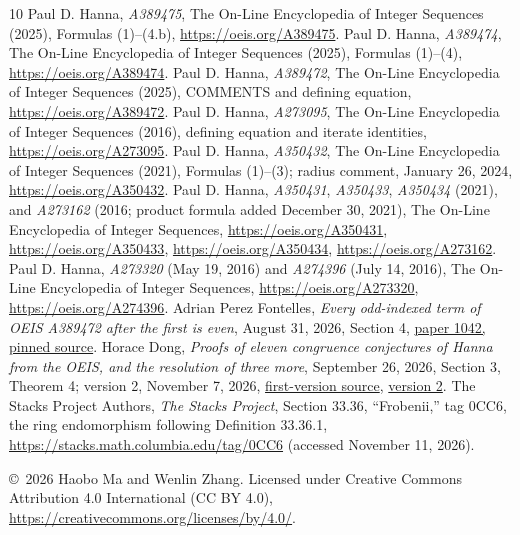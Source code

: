 \documentclass[11pt]{article}
\begin{document}
\begin{thebibliography}{10}
Paul D. Hanna, \emph{A389475}, The On-Line Encyclopedia of Integer
Sequences (2025), Formulas (1)--(4.b),
\url{https://oeis.org/A389475}.
Paul D. Hanna, \emph{A389474}, The On-Line Encyclopedia of Integer
Sequences (2025), Formulas (1)--(4),
\url{https://oeis.org/A389474}.
Paul D. Hanna, \emph{A389472}, The On-Line Encyclopedia of Integer
Sequences (2025), COMMENTS and defining equation,
\url{https://oeis.org/A389472}.
Paul D. Hanna, \emph{A273095}, The On-Line Encyclopedia of Integer
Sequences (2016), defining equation and iterate identities,
\url{https://oeis.org/A273095}.
Paul D. Hanna, \emph{A350432}, The On-Line Encyclopedia of Integer
Sequences (2021), Formulas (1)--(3); radius comment, January 26, 2024,
\url{https://oeis.org/A350432}.
Paul D. Hanna, \emph{A350431}, \emph{A350433}, \emph{A350434} (2021),
and \emph{A273162} (2016; product formula added December 30, 2021),
The On-Line Encyclopedia of Integer Sequences,
\url{https://oeis.org/A350431}, \url{https://oeis.org/A350433},
\url{https://oeis.org/A350434}, \url{https://oeis.org/A273162}.
Paul D. Hanna, \emph{A273320} (May 19, 2016) and \emph{A274396}
(July 14, 2016), The On-Line Encyclopedia of Integer Sequences,
\url{https://oeis.org/A273320}, \url{https://oeis.org/A274396}.
Adrian Perez Fontelles, \emph{Every odd-indexed term of OEIS A389472
after the first is even}, August 31, 2026, Section 4,
\href{https://github.com/astrafala/Conjectures/blob/58cf4596af4541652fb191e177ef9b7771388d53/paper-sources/01001-01500/01042-PROOF.tex}{paper 1042, pinned source}.
Horace Dong, \emph{Proofs of eleven congruence conjectures of Hanna
from the OEIS, and the resolution of three more}, September 26, 2026,
Section 3, Theorem 4; version 2, November 7, 2026,
\href{https://github.com/Horace-Maxwell/ai4math-results/blob/537ae6c44a450566edd06fda208de775ec7d7c9c/papers/oeis-hanna/note.tex}{first-version source},
\href{https://github.com/Horace-Maxwell/ai4math-results/blob/a104be9c0d4aaeeea65f6f62fed064525180a939/papers/oeis-hanna/note.pdf}{version 2}.
The Stacks Project Authors, \emph{The Stacks Project}, Section 33.36,
``Frobenii,'' tag 0CC6, the ring endomorphism following Definition 33.36.1,
\url{https://stacks.math.columbia.edu/tag/0CC6} (accessed November 11, 2026).
\end{thebibliography}

\noindent\small
\copyright\ 2026 Haobo Ma and Wenlin Zhang.
Licensed under Creative Commons Attribution 4.0 International (CC BY 4.0),
\url{https://creativecommons.org/licenses/by/4.0/}.
\end{document}
